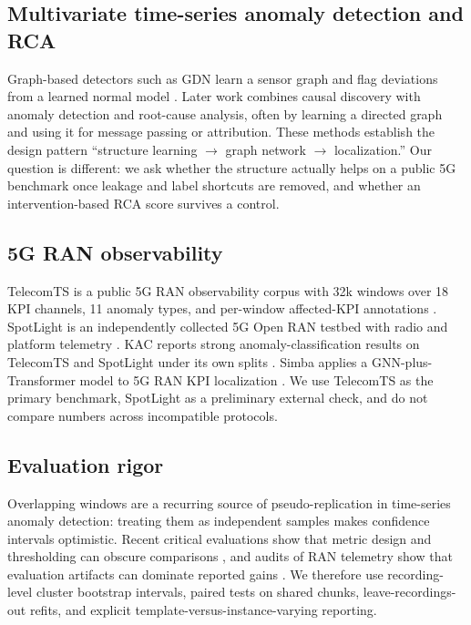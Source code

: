 \documentclass[conference]{IEEEtran}
\begin{document}
\subsection{Multivariate time-series anomaly detection and RCA}

Graph-based detectors such as GDN learn a sensor graph and flag deviations from a learned normal model \cite{deng2021gdn}. Later work combines causal discovery with anomaly detection and root-cause analysis, often by learning a directed graph and using it for message passing or attribution. These methods establish the design pattern ``structure learning $\rightarrow$ graph network $\rightarrow$ localization.'' Our question is different: we ask whether the structure actually helps on a public 5G benchmark once leakage and label shortcuts are removed, and whether an intervention-based RCA score survives a control.

\subsection{5G RAN observability}

TelecomTS is a public 5G RAN observability corpus with 32k windows over 18 KPI channels, 11 anomaly types, and per-window affected-KPI annotations \cite{feng2025telecomts}. SpotLight is an independently collected 5G Open RAN testbed with radio and platform telemetry \cite{sun2024spotlight}. KAC reports strong anomaly-classification results on TelecomTS and SpotLight under its own splits \cite{salavati2026kac}. Simba applies a GNN-plus-Transformer model to 5G RAN KPI localization \cite{simba2024}. We use TelecomTS as the primary benchmark, SpotLight as a preliminary external check, and do not compare numbers across incompatible protocols.

\subsection{Evaluation rigor}

Overlapping windows are a recurring source of pseudo-replication in time-series anomaly detection: treating them as independent samples makes confidence intervals optimistic. Recent critical evaluations show that metric design and thresholding can obscure comparisons \cite{bello2026gnn_tsad}, and audits of RAN telemetry show that evaluation artifacts can dominate reported gains \cite{fard2026crosslayer}. We therefore use recording-level cluster bootstrap intervals, paired tests on shared chunks, leave-recordings-out refits, and explicit template-versus-instance-varying reporting.
\end{document}
